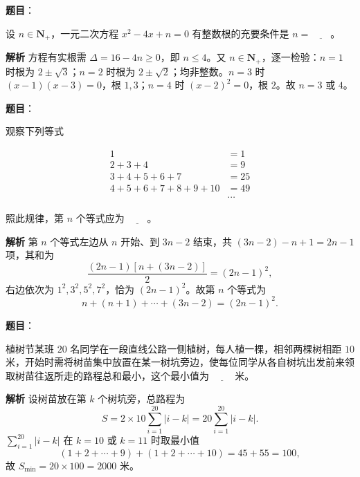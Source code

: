 \begin{answer}

\textbf{题目}：

设 $n\in\mathbf N_+$，一元二次方程 $x^2-4x+n=0$ 有整数根的充要条件是 $n=\underline{\qquad}$。

\textbf{解析}
方程有实根需 $\Delta=16-4n\geqslant0$，即 $n\leqslant4$。又 $n\in\mathbf N_+$，逐一检验：$n=1$ 时根为 $2\pm\sqrt3$；$n=2$ 时根为 $2\pm\sqrt2$；均非整数。$n=3$ 时 $(x-1)(x-3)=0$，根 $1,3$；$n=4$ 时 $(x-2)^2=0$，根 $2$。故 $n=3$ 或 $4$。


\end{answer}
\begin{answer}

\textbf{题目}：

观察下列等式

\nopagebreak[4]
\[\begin{aligned}
1&=1\\
2+3+4&=9\\
3+4+5+6+7&=25\\
4+5+6+7+8+9+10&=49\\
&\cdots
\end{aligned}\]

照此规律，第 $n$ 个等式应为 $\underline{\qquad}$。

\textbf{解析}
第 $n$ 个等式左边从 $n$ 开始、到 $3n-2$ 结束，共 $(3n-2)-n+1=2n-1$ 项，其和为
\nopagebreak[4]
\[\frac{(2n-1)\left[n+(3n-2)\right]}2=(2n-1)^2,\]
右边依次为 $1^2,3^2,5^2,7^2$，恰为 $(2n-1)^2$。故第 $n$ 个等式为
\nopagebreak[4]
\[n+(n+1)+\cdots+(3n-2)=(2n-1)^2.\]


\end{answer}
\begin{answer}

\textbf{题目}：

植树节某班 $20$ 名同学在一段直线公路一侧植树，每人植一棵，相邻两棵树相距 $10$ 米，开始时需将树苗集中放置在某一树坑旁边，使每位同学从各自树坑出发前来领取树苗往返所走的路程总和最小，这个最小值为 $\underline{\qquad}$ 米。

\textbf{解析}
设树苗放在第 $k$ 个树坑旁，总路程为
\nopagebreak[4]
\[S=2\times10\sum_{i=1}^{20}|i-k|=20\sum_{i=1}^{20}|i-k|.\]
$\displaystyle\sum_{i=1}^{20}|i-k|$ 在 $k=10$ 或 $k=11$ 时取最小值
\nopagebreak[4]
\[(1+2+\cdots+9)+(1+2+\cdots+10)=45+55=100,\]
故 $S_{\min}=20\times100=2000$ 米。


\end{answer}
